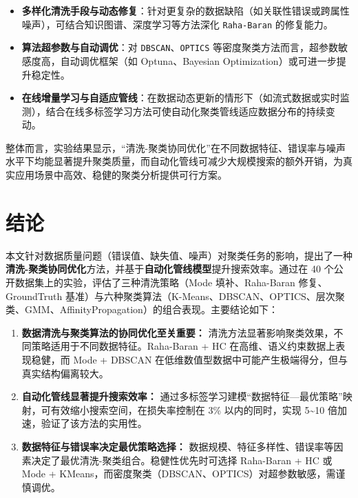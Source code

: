 \documentclass[10pt]{article} %
\numberwithin{equation}{section}
\begin{document}
\begin{itemize}
    \item \textbf{多样化清洗手段与动态修复}：针对更复杂的数据缺陷（如关联性错误或跨属性噪声），可结合知识图谱、深度学习等方法深化 \texttt{Raha-Baran} 的修复能力。
    \item \textbf{算法超参数与自动调优}：对 \texttt{DBSCAN}、\texttt{OPTICS} 等密度聚类方法而言，超参数敏感度高，自动调优框架（如 Optuna、Bayesian Optimization）或可进一步提升稳定性。
    \item \textbf{在线增量学习与自适应管线}：在数据动态更新的情形下（如流式数据或实时监测），结合在线多标签学习方法可使自动化聚类管线适应数据分布的持续变动。
\end{itemize}

整体而言，实验结果显示，“清洗-聚类协同优化”在不同数据特征、错误率与噪声水平下均能显著提升聚类质量，而自动化管线可减少大规模搜索的额外开销，为真实应用场景中高效、稳健的聚类分析提供可行方案。


\section{结论}
\label{sec:conclusion}

本文针对数据质量问题（错误值、缺失值、噪声）对聚类任务的影响，提出了一种\textbf{清洗-聚类协同优化}方法，并基于\textbf{自动化管线模型}提升搜索效率。通过在 40 个公开数据集上的实验，评估了三种清洗策略（Mode 填补、Raha-Baran 修复、GroundTruth 基准）与六种聚类算法（K-Means、DBSCAN、OPTICS、层次聚类、GMM、AffinityPropagation）的组合表现。主要结论如下：

\begin{enumerate}
    \item \textbf{数据清洗与聚类算法的协同优化至关重要：}  
    清洗方法显著影响聚类效果，不同策略适用于不同数据特征。Raha-Baran + HC 在高维、语义约束数据上表现稳健，而 Mode + DBSCAN 在低维数值型数据中可能产生极端得分，但与真实结构偏离较大。

    \item \textbf{自动化管线显著提升搜索效率：}  
    通过多标签学习建模“数据特征—最优策略”映射，可有效缩小搜索空间，在损失率控制在 3\% 以内的同时，实现 5\textasciitilde10 倍加速，验证了该方法的实用性。

    \item \textbf{数据特征与错误率决定最优策略选择：}  
    数据规模、特征多样性、错误率等因素决定了最优清洗-聚类组合。稳健性优先时可选择 Raha-Baran + HC 或 Mode + KMeans，而密度聚类（DBSCAN、OPTICS）对超参数敏感，需谨慎调优。
\end{enumerate}
\end{document}
